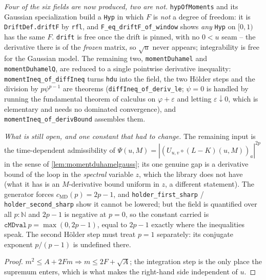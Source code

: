 \begin{theorem}
  \emph{Four of the six fields are now produced, two are not.}  \texttt{hypOfMoments} and its
  Gaussian specialization build a \texttt{Hyp} in which $F$ is \emph{not} a degree of freedom:
  it is \texttt{DriftDef.driftF} by \texttt{rfl}, and \texttt{F\_eq\_driftF\_of\_window} shows
  \emph{any} \texttt{Hyp} on $[0,1)$ has the same $F$.  \texttt{drift} is free once the drift is
  pinned, with no $0<u$ seam -- the derivative there is of the \emph{frozen} matrix, so $\sqrt u$
  never appears; integrability is free for the Gaussian model.  The remaining two,
  \texttt{momentDuhamel} and \texttt{momentDuhamelQ}, are reduced to a single pointwise
  derivative inequality: \texttt{momentIneq\_of\_diffIneq} turns \texttt{hdu} into the field, the
  two H\"older steps and the division by $p\psi^{p-1}$ are theorems
  (\texttt{diffIneq\_of\_deriv\_le}; $\psi=0$ is handled by running the fundamental theorem of
  calculus on $\varphi+\varepsilon$ and letting $\varepsilon\downarrow0$, which is elementary and
  needs no dominated convergence), and \texttt{momentIneq\_of\_derivBound} assembles them.

  \emph{What is still open, and one constant that had to change.}  The remaining input is the
  time-dependent admissibility of $\Psi(u,M)=|(U_{u,v}\circ(L-K)(u,M))_a|^{2p}$ in the sense of
  \ref{lem:momentduhamelgauss}; its one genuine gap is a derivative bound of the loop in the
  \emph{spectral} variable $z$, which the library does not have (what it has is an
  $M$-derivative bound uniform in $z$, a different statement).  The generator forces
  $c_{\mathrm{MD}}(p)=2p-1$, and \texttt{holder\_first\_sharp} /
  \texttt{holder\_second\_sharp} show it cannot be lowered; but the field is quantified over all
  $p:\mathbb N$ and $2p-1$ is negative at $p=0$, so the constant carried is
  $\texttt{cMDval}\,p=\max(0,2p-1)$, equal to $2p-1$ exactly where the inequalities speak.
  The second H\"older step must treat $p=1$ separately: its conjugate exponent $p/(p-1)$ is
  undefined there.
\end{theorem}
\begin{proof}\leanok
  $m^2\le A+2Fm\Rightarrow m\le2F+\sqrt A$; the integration step is the only place the supremum
  enters, which is what makes the right-hand side independent of $u$.
\end{proof}

